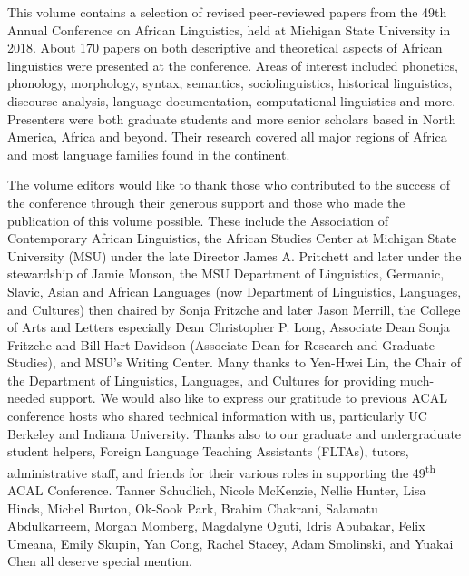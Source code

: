 \begin{refsection}
This volume contains a selection of revised peer-reviewed papers from the 49th Annual Conference on African Linguistics, held at Michigan State University in 2018. About 170 papers on both descriptive and theoretical aspects of African linguistics were presented at the conference. Areas of interest included phonetics, phonology, morphology, syntax, semantics, sociolinguistics, historical linguistics, discourse analysis, language documentation, computational linguistics and more. Presenters were both graduate students and more senior scholars based in North America, Africa and beyond. Their research covered all major regions of Africa and most language families found in the continent. 

The volume editors would like to thank those who contributed to the success of the conference through their generous support and those who made the publication of this volume possible. These include the Association of Contemporary African Linguistics, the African Studies Center at Michigan State University (MSU) under the late Director James A. Pritchett and later under the stewardship of Jamie Monson, the MSU Department of Linguistics, Germanic, Slavic, Asian and African Languages (now Department of Linguistics, Languages, and Cultures) then chaired by Sonja Fritzche and later Jason Merrill, the College of Arts and Letters especially Dean Christopher P. Long,  Associate Dean Sonja Fritzche and Bill Hart-Davidson (Associate Dean for Research and Graduate Studies), and MSU’s Writing Center. Many thanks to Yen-Hwei Lin, the Chair of the Department of Linguistics, Languages, and Cultures for providing much-needed support. We would also like to express our gratitude to previous ACAL conference hosts who shared technical information with us, particularly UC Berkeley and Indiana University. Thanks also to our graduate and undergraduate student helpers, Foreign Language Teaching Assistants (FLTAs), tutors, administrative staff, and friends for their various roles in supporting the 49\textsuperscript{th} ACAL Conference. Tanner Schudlich, Nicole McKenzie, Nellie Hunter, Lisa Hinds, Michel Burton, Ok-Sook Park, Brahim Chakrani, Salamatu Abdulkarreem, Morgan Momberg, Magdalyne Oguti, Idris Abubakar, Felix Umeana, Emily Skupin, Yan Cong, Rachel Stacey, Adam Smolinski, and Yuakai Chen all deserve special mention.


\end{refsection}
